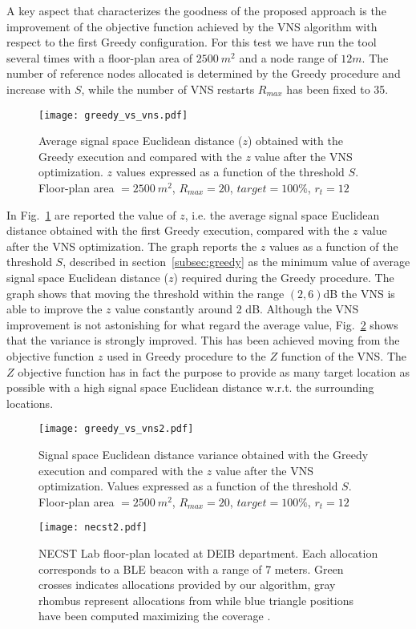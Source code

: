 A key aspect that characterizes the goodness of the proposed approach is the improvement of the objective function achieved by the VNS algorithm with respect to the first Greedy configuration. For this test we have run the tool several times with a floor-plan area of $2500~m^2$ and a node range of $12m$. The number of reference nodes allocated is determined by the Greedy procedure and increase with $S$, while the number of VNS restarts $R_{max}$ has been fixed to 35.

\begin{figure}[h!tb]
\centering\texttt{[image: greedy\_vs\_vns.pdf]}
\caption{Average signal space Euclidean distance ($z$) obtained with the Greedy execution and compared with the $z$ value after the VNS optimization. $z$ values expressed as a function of the threshold $S$. Floor-plan area $=2500~m^2$, $R_{max} = 20$, $target = 100\%$, $r_t=12$}
\label{fig:greedy_vns}
\end{figure}

In Fig.~\ref{fig:greedy_vns} are reported the value of $z$, i.e. the average signal space Euclidean distance obtained with the first Greedy execution, compared with the $z$ value after the VNS optimization. The graph reports the $z$ values as a function of the threshold $S$, described in section~\ref{subsec:greedy} as the minimum value of average signal space Euclidean distance ($z$) required during the Greedy procedure. The graph shows that moving the threshold within the range $(2,6)$dB the VNS is able to improve the $z$ value constantly around 2 dB.
Although the VNS improvement is not astonishing for what regard the average value, Fig.~\ref{fig:greedy_vns2} shows that the variance is strongly improved. This has been achieved moving from the objective function $z$ used in Greedy procedure to the $Z$ function of the VNS. The $Z$ objective function has in fact the purpose to provide as many target location as possible with a high signal space Euclidean distance w.r.t. the surrounding locations.

\begin{figure}[h!tb]
\centering\texttt{[image: greedy\_vs\_vns2.pdf]}
\caption{Signal space Euclidean distance variance obtained with the Greedy execution and compared with the $z$ value after the VNS optimization. Values expressed as a function of the threshold $S$. Floor-plan area $=2500~m^2$, $R_{max} = 20$, $target = 100\%$, $r_t=12$}
\label{fig:greedy_vns2}
\end{figure}

\begin{figure}
\texttt{[image: necst2.pdf]}
\caption[NECST Lab floor-plan used as indoor environment testbed for deployments evaluation.]{NECST Lab floor-plan located at DEIB department. Each allocation corresponds to a BLE beacon with a range of 7 meters. Green crosses indicates allocations provided by our algorithm, gray rhombus represent allocations from \cite{He2011} while blue triangle positions have been computed maximizing the coverage \cite{Kouakou2010a}.}
\label{fig:necst}
\end{figure}


